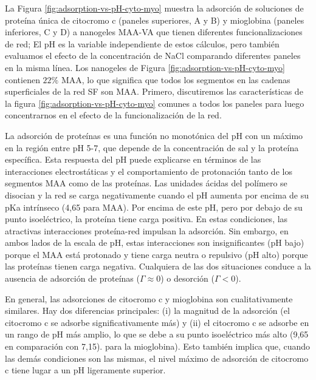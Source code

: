  
 La Figura \ref{fig:adsorption-vs-pH-cyto-myo} muestra la adsorci\'on de soluciones de prote\'ina \'unica de citocromo c (paneles superiores, A y B) y mioglobina (paneles inferiores, C y D) a nanogeles MAA-VA que tienen diferentes funcionalizaciones de red;
 El pH es la variable independiente de estos c\'alculos, pero tambi\'en evaluamos el efecto de la concentraci\'on de NaCl comparando diferentes paneles en la misma l\'inea.
 Los nanogeles de Figura \ref{fig:adsorption-vs-pH-cyto-myo} contienen $22\%$ MAA, lo que significa que todos los segmentos en las cadenas superficiales de la red SF son MAA.
 Primero, discutiremos las caracter\'isticas de la figura \ref{fig:adsorption-vs-pH-cyto-myo} comunes a todos los paneles para luego concentrarnos en el efecto de la funcionalizaci\'on de la red.
 
 
 
 La adsorci\'on de prote\'inas es una funci\'on no monot\'onica del pH con un m\'aximo en la regi\'on entre pH 5-7, que depende de la concentraci\'on de sal y la prote\'ina espec\'ifica.
 Esta respuesta del pH puede explicarse en t\'erminos de las interacciones electrost\'aticas y el comportamiento de protonaci\'on tanto de los segmentos MAA como de las prote\'inas.
 Las unidades \'acidas del pol\'imero se disocian y la red se carga negativamente cuando el pH aumenta por encima de su pKa intr\'inseco (4,65 para MAA).
 Por encima de este pH, pero por debajo de su punto isoel\'ectrico, la prote\'ina tiene carga positiva.
 En estas condiciones, las atractivas interacciones prote\'ina-red impulsan la adsorci\'on.
 Sin embargo, en ambos lados de la escala de pH, estas interacciones son insignificantes (pH bajo) porque el MAA est\'a protonado y tiene carga neutra o repulsivo (pH alto) porque las prote\'inas tienen carga negativa.
 Cualquiera de las dos situaciones conduce a la ausencia de adsorci\'on de prote\'inas ($\Gamma\approx 0$) o desorci\'on ($\Gamma< 0$).
 
 
 
 En general, las adsorciones de citocromo c y mioglobina son cualitativamente similares.
 Hay dos diferencias principales: (i) la magnitud de la adsorci\'on (el citocromo c se adsorbe significativamente m\'as) y (ii) el citocromo c se adsorbe en un rango de pH m\'as amplio, lo que se debe a su punto isoel\'ectrico m\'as alto (9,65 en comparaci\'on con 7,15). para la mioglobina).
 Esto tambi\'en implica que, cuando las dem\'as condiciones son las mismas, el nivel m\'aximo de adsorci\'on de citocromo c tiene lugar a un pH ligeramente superior.
 
